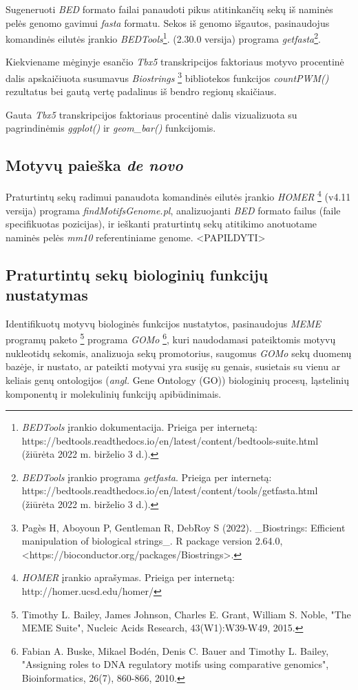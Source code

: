 \documentclass[12pt]{article}
\begin{document}
Sugeneruoti \emph{BED} formato failai panaudoti pikus atitinkančių
sekų iš naminės pelės genomo gavimui \emph{fasta} formatu.
Sekos iš genomo išgautos, pasinaudojus komandinės eilutės įrankio
\emph{BEDTools}\footnote{\emph{BEDTools} įrankio dokumentacija.
Prieiga per internetą:\\ 
https://bedtools.readthedocs.io/en/latest/content/bedtools-suite.html
(žiūrėta 2022 m. birželio 3 d.).}.
(2.30.0 versija) programa \emph{getfasta}\footnote{\emph{BEDTools}
įrankio programa \emph{getfasta}. Prieiga per internetą:\\
https://bedtools.readthedocs.io/en/latest/content/tools/getfasta.html
(žiūrėta 2022 m. birželio 3 d.).}.

Kiekviename mėginyje esančio \emph{Tbx5} transkripcijos faktoriaus
motyvo procentinė dalis apskaičiuota susumavus \emph{Biostrings}
\footnote{Pagès H, Aboyoun P, Gentleman R, DebRoy S (2022). \_Biostrings:
Efficient manipulation of biological strings\_. R package version
2.64.0, <https://bioconductor.org/packages/Biostrings>.}
bibliotekos funkcijos \emph{countPWM()} rezultatus bei gautą
vertę padalinus iš bendro regionų skaičiaus.

Gauta \emph{Tbx5} transkripcijos faktoriaus procentinė dalis
vizualizuota su pagrindinėmis \emph{ggplot()} ir \emph{geom\_bar()}
funkcijomis.

\subsection{Motyvų paieška \emph{de novo}}
Praturtintų sekų radimui panaudota komandinės eilutės įrankio
\emph{HOMER} \footnote{\emph{HOMER} įrankio aprašymas.
Prieiga per internetą:\\ http://homer.ucsd.edu/homer/}
(v4.11 versija) programa \emph{findMotifsGenome.pl},
analizuojanti \emph{BED} formato failus (faile specifikuotas
pozicijas), ir ieškanti praturtintų sekų atitikimo anotuotame
naminės pelės \emph{mm10} referentiniame genome.
<PAPILDYTI>

\subsection{Praturtintų sekų biologinių funkcijų nustatymas}
Identifikuotų motyvų biologinės funkcijos nustatytos, pasinaudojus
\emph{MEME} programų paketo \footnote{Timothy L. Bailey, James Johnson,
Charles E. Grant, William S. Noble, "The MEME Suite", Nucleic Acids
Research, 43(W1):W39-W49, 2015.} programa \emph{GOMo}
\footnote{Fabian A. Buske, Mikael Bodén, Denis C. Bauer and Timothy
L. Bailey, "Assigning roles to DNA regulatory motifs using
comparative genomics", Bioinformatics, 26(7), 860-866, 2010.}, kuri
naudodamasi pateiktomis motyvų nukleotidų sekomis, analizuoja sekų
promotorius, saugomus \emph{GOMo} sekų duomenų bazėje, ir nustato,
ar pateikti motyvai yra susiję su genais, susietais su vienu ar
keliais genų ontologijos (\emph{angl.} Gene Ontology (GO))
biologinių procesų, ląstelinių komponentų ir molekulinių funkcijų
apibūdinimais.
\end{document}
